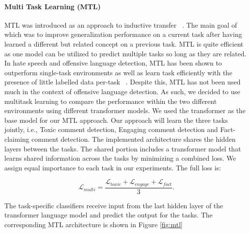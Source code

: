\documentclass[11pt,a4paper]{article}
\begin{document}
\paragraph{Multi Task Learning (MTL)} MTL was introduced as an approach to inductive transfer ~\cite{caruana_multitask_1997}. The main goal of which was to improve generalization performance on a current task after having learned a different but related concept on a previous task.  MTL is quite efficient as one model can be utilized to predict multiple tasks so long as they are related. In hate speech and offensive language detection, MTL has been shown to outperform single-task environments as well as learn task efficiently with the presence of little labelled data per-task ~\cite{djandji-etal-2020-multi}. Despite this, MTL has not been used much in the context of offensive language detection. As such, we decided to use multitask learning to compare the performance within the two different environments using different transformer models. We used the transformer as the base model for our MTL approach. Our approach will learn the three tasks jointly, i.e., Toxic comment detection, Engaging comment detection and Fact-claiming comment detection. The implemented architecture shares the hidden layers between the tasks. The shared portion includes a transformer model that learns shared information across the tasks by minimizing a combined loss. We assign equal importance to each task in our experiments. The full loss is: 

\begin{equation}
\label{eqn:mad_loss_germeval}
   \mathcal{L}_{multi} = \frac{\mathcal{L}_{toxic} + \mathcal{L}_{engage} + \mathcal{L}_{fact}}{3} \mbox{.}
\end{equation}

\noindent The task-specific classifiers receive input from the last hidden layer of the transformer language model and predict the output for the tasks. The corresponding MTL architecture is shown in Figure \ref{fig:mtl}
\end{document}
